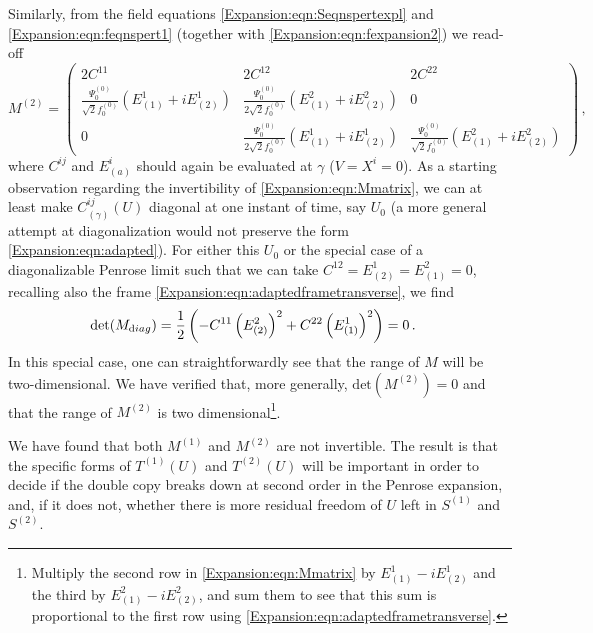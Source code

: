 Similarly, from the field equations \eqref{Expansion:eqn:Seqnspertexpl} and \eqref{Expansion:eqn:feqnspert1} (together with \eqref{Expansion:eqn:fexpansion2}) we read-off
\begin{equation}\label{Expansion:eqn:Mmatrix}
M^{(2)} = \begin{pmatrix}
2 C^{11} & 2 C^{12} & 2 C^{22} \\
\frac{\Psi^{(0)}_0}{\sqrt{2} f_0^{(0)}} \left(E^1_{(1)}+i E^1_{(2)}\right) & \frac{\Psi^{(0)}_0}{2\sqrt{2} f_0^{(0)}} \left(E^2_{(1)}+i E^2_{(2)}\right) & 0\\
0 & \frac{\Psi^{(0)}_0}{2\sqrt{2} f_0^{(0)}}  \left(E^1_{(1)}+i E^1_{(2)}\right) &  	\frac{\Psi^{(0)}_0}{\sqrt{2} f_0^{(0)}}\left(E^2_{(1)}+i E^2_{(2)}\right)
\end{pmatrix} \, ,
\end{equation} 
where $C^{ij}$ and $E^i_{(a)}$ should again be evaluated at $\gamma$ ($V=X^i=0$). As a starting observation regarding the invertibility of \eqref{Expansion:eqn:Mmatrix}, we can at least make $C^{ij}_{(\gamma)}(U)$ diagonal at one instant of time, say $U_0$ (a more general attempt at diagonalization would not preserve the form \eqref{Expansion:eqn:adapted}). For either this $U_0$ or the special case of a diagonalizable Penrose limit \cite{Tod:2019urw} such that we can take  $C^{12} = E^1_{(2)} = E^2_{(1)} = 0$, recalling also the frame \eqref{Expansion:eqn:adaptedframetransverse}, we find
\begin{equation}\label{Expansion:eqn:detMdiag}
\begin{aligned}
\text{det}(M_{\textrm diag})
&= \frac{1}{2}\left( -C^{11}\left(E^2_{(2)}\right)^2 + C^{22}\left(E^1_{(1)}\right)^2\right) = 0 \, .
\end{aligned}
\end{equation}
In this special case, one can straightforwardly see that the range of $M$ will be two-dimensional. We have verified that, more generally, $\text{det}(M^{(2)}) = 0$ and that the range of $M^{(2)}$ is two dimensional\footnote{Multiply the second row in \eqref{Expansion:eqn:Mmatrix} by $E^1_{(1)}-i E^1_{(2)}$ and the third by $E^2_{(1)}-i E^2_{(2)}$, and sum them to see that this sum is proportional to the first row using \eqref{Expansion:eqn:adaptedframetransverse}.}.

We have found that both $M^{(1)}$ and $M^{(2)}$ are not invertible. The result is that the specific forms of $T^{(1)}(U)$ and $T^{(2)}(U)$ will be important in order to decide if the double copy breaks down at second order in the Penrose expansion, and, if it does not, whether there is more residual freedom of $U$ left in  $S^{(1)}$ and $S^{(2)}$.

